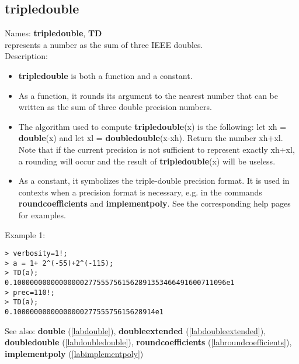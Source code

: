 \subsection{tripledouble}
\label{labtripledouble}
\noindent Names: \textbf{tripledouble}, \textbf{TD}\\
represents a number as the sum of three IEEE doubles.\\

\noindent Description: \begin{itemize}

\item \textbf{tripledouble} is both a function and a constant.

\item As a function, it rounds its argument to the nearest number that can be written
   as the sum of three double precision numbers.

\item The algorithm used to compute \textbf{tripledouble}(x) is the following: let xh = \textbf{double}(x)
   and let xl = \textbf{doubledouble}(x-xh). Return the number xh+xl. Note that if the
   current precision is not sufficient to represent exactly xh+xl, a rounding will
   occur and the result of \textbf{tripledouble}(x) will be useless.

\item As a constant, it symbolizes the triple-double precision format. It is used in 
   contexts when a precision format is necessary, e.g. in the commands 
   \textbf{roundcoefficients} and \textbf{implementpoly}.
   See the corresponding help pages for examples.
\end{itemize}
\noindent Example 1: 
\begin{center}\begin{minipage}{15cm}\begin{Verbatim}[frame=single]
> verbosity=1!;
> a = 1+ 2^(-55)+2^(-115);
> TD(a);
0.100000000000000002775557561562891353466491600711096e1
> prec=110!;
> TD(a);
0.1000000000000000027755575615628914e1
\end{Verbatim}
\end{minipage}\end{center}
See also: \textbf{double} (\ref{labdouble}), \textbf{doubleextended} (\ref{labdoubleextended}), \textbf{doubledouble} (\ref{labdoubledouble}), \textbf{roundcoefficients} (\ref{labroundcoefficients}), \textbf{implementpoly} (\ref{labimplementpoly})
